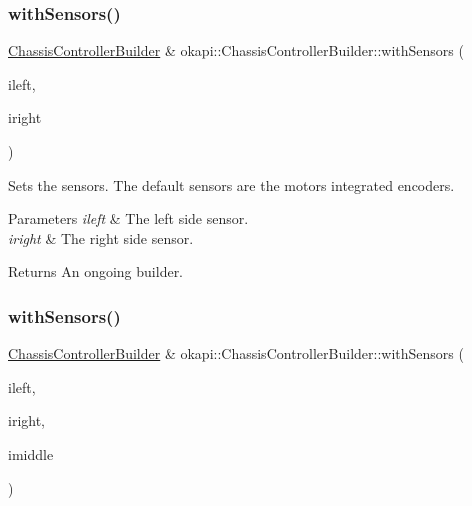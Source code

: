\subsubsection{\texorpdfstring{withSensors()}{withSensors()}\hspace{0.1cm}{\footnotesize\ttfamily [1/6]}}
{\footnotesize\ttfamily \mbox{\hyperlink{classokapi_1_1ChassisControllerBuilder}{Chassis\+Controller\+Builder}} \& okapi\+::\+Chassis\+Controller\+Builder\+::with\+Sensors (\begin{DoxyParamCaption}\item[{const \mbox{\hyperlink{classokapi_1_1ADIEncoder}{A\+D\+I\+Encoder}} \&}]{ileft,  }\item[{const \mbox{\hyperlink{classokapi_1_1ADIEncoder}{A\+D\+I\+Encoder}} \&}]{iright }\end{DoxyParamCaption})}

Sets the sensors. The default sensors are the motor\textquotesingle{}s integrated encoders.


\begin{DoxyParams}{Parameters}
{\em ileft} & The left side sensor. \\
\hline
{\em iright} & The right side sensor. \\
\hline
\end{DoxyParams}
\begin{DoxyReturn}{Returns}
An ongoing builder. 
\end{DoxyReturn}
\mbox{\label{classokapi_1_1ChassisControllerBuilder_a5733a2198a3f10befcae5ee2a9a02d7e}} 
\subsubsection{\texorpdfstring{withSensors()}{withSensors()}\hspace{0.1cm}{\footnotesize\ttfamily [2/6]}}
{\footnotesize\ttfamily \mbox{\hyperlink{classokapi_1_1ChassisControllerBuilder}{Chassis\+Controller\+Builder}} \& okapi\+::\+Chassis\+Controller\+Builder\+::with\+Sensors (\begin{DoxyParamCaption}\item[{const \mbox{\hyperlink{classokapi_1_1ADIEncoder}{A\+D\+I\+Encoder}} \&}]{ileft,  }\item[{const \mbox{\hyperlink{classokapi_1_1ADIEncoder}{A\+D\+I\+Encoder}} \&}]{iright,  }\item[{const \mbox{\hyperlink{classokapi_1_1ADIEncoder}{A\+D\+I\+Encoder}} \&}]{imiddle }\end{DoxyParamCaption})}

